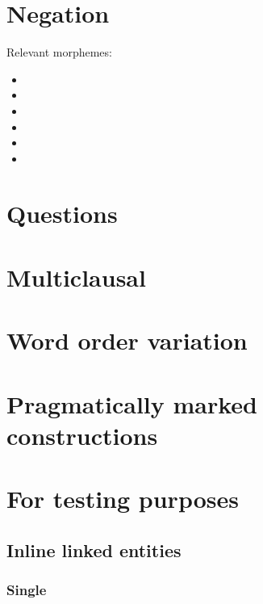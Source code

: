 \documentclass{memoir}
\begin{document}
\chapter{\texorpdfstring{Negation \label{negation}}{Negation }}

Relevant morphemes:

\begin{itemize}
\item
\item
\item
\item
\item
\item
\end{itemize}

\chapter{\texorpdfstring{Questions \label{questions}}{Questions }}

\chapter{\texorpdfstring{Multiclausal
\label{multiclausal}}{Multiclausal }}

\chapter{\texorpdfstring{Word order variation
\label{wordorder}}{Word order variation }}

\chapter{\texorpdfstring{Pragmatically marked constructions
\label{marked}}{Pragmatically marked constructions }}

\chapter{For testing purposes}

\section{Inline linked entities}

\subsection{Single}
\end{document}
